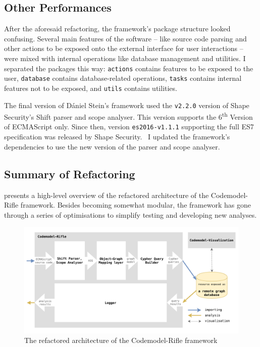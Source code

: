 \subsection{Other Performances}

After the aforesaid refactoring, the framework's package structure looked confusing. Several main features of the software – like source code parsing and other actions to be exposed onto the external interface for user interactions – were mixed with internal operations like database management and utilities. I separated the packages this way: \texttt{actions} contains features to be exposed to the user, \texttt{database} contains database-related operations, \texttt{tasks} contains internal features not to be exposed, and \texttt{utils} contains utilities.

The final version of Dániel Stein's framework used the \texttt{v2.2.0} version of Shape Security's Shift parser and scope analyser. This version supports the 6\textsuperscript{th} Version of ECMAScript only. Since then, version \texttt{es2016-v1.1.1} supporting the full ES7 specification was released by Shape Security.~\cite{shift-ast, shift-java-github} I updated the framework's dependencies to use the new version of the parser and scope analyser.

\subsection{Summary of Refactoring}

 presents a high-level overview of the refactored architecture of the Codemodel-Rifle framework. Besides becoming somewhat modular, the framework has gone through a series of optimisations to simplify testing and developing new analyses.

\begin{figure}[!htb]
	\centering
	\includegraphics[width=\textwidth, trim=3mm 3mm 3mm 3mm,clip]{figures/codemodel-rifle-refactored-architecture.pdf}
	\caption{The refactored architecture of the Codemodel-Rifle framework}
	\label{fig:codemodel-rifle-refactored-architecture}
\end{figure}


